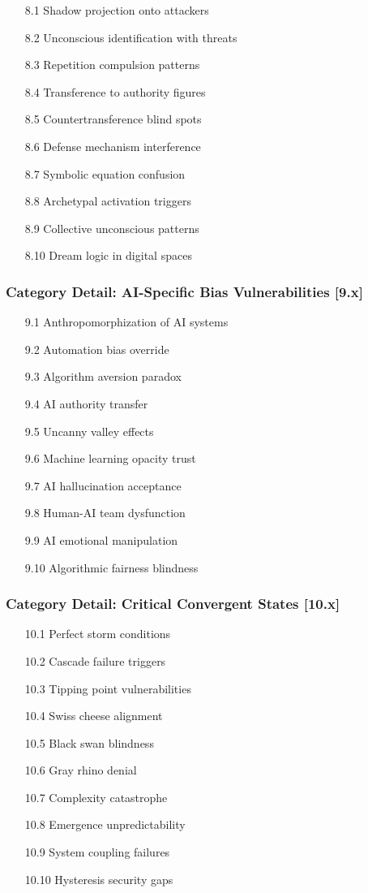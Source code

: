 \documentclass[11pt,a4paper]{article}
\begin{document}
\begin{enumerate}
\item[8.1] Shadow projection onto attackers
\item[8.2] Unconscious identification with threats
\item[8.3] Repetition compulsion patterns
\item[8.4] Transference to authority figures
\item[8.5] Countertransference blind spots
\item[8.6] Defense mechanism interference
\item[8.7] Symbolic equation confusion
\item[8.8] Archetypal activation triggers
\item[8.9] Collective unconscious patterns
\item[8.10] Dream logic in digital spaces
\end{enumerate}

\subsubsection{Category Detail: AI-Specific Bias Vulnerabilities [9.x]}

\begin{enumerate}
\item[9.1] Anthropomorphization of AI systems
\item[9.2] Automation bias override
\item[9.3] Algorithm aversion paradox
\item[9.4] AI authority transfer
\item[9.5] Uncanny valley effects
\item[9.6] Machine learning opacity trust
\item[9.7] AI hallucination acceptance
\item[9.8] Human-AI team dysfunction
\item[9.9] AI emotional manipulation
\item[9.10] Algorithmic fairness blindness
\end{enumerate}

\subsubsection{Category Detail: Critical Convergent States [10.x]}

\begin{enumerate}
\item[10.1] Perfect storm conditions
\item[10.2] Cascade failure triggers
\item[10.3] Tipping point vulnerabilities
\item[10.4] Swiss cheese alignment
\item[10.5] Black swan blindness
\item[10.6] Gray rhino denial
\item[10.7] Complexity catastrophe
\item[10.8] Emergence unpredictability
\item[10.9] System coupling failures
\item[10.10] Hysteresis security gaps
\end{enumerate}
\end{document}
